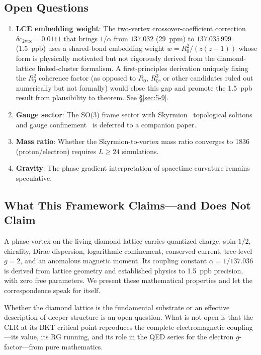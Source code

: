 \documentclass[aps,prd,onecolumn,superscriptaddress,floatfix,12pt]{revtex4-2}
\newcommand{\Rzero}{R_0}
\begin{document}
\subsection{Open Questions}\label{sec:8-2}

\begin{enumerate}
\item \textbf{LCE embedding weight}: The two-vertex crossover-coefficient correction $\delta c_{2\text{vtx}} = 0.0111$ that brings $1/\alpha$ from $137.032$ (29~ppm) to $137.035\,999$ (1.5~ppb) uses a shared-bond embedding weight $w = \Rzero^2/(z(z-1))$ whose form is physically motivated but not rigorously derived from the diamond-lattice linked-cluster formalism. A first-principles derivation uniquely fixing the $\Rzero^2$ coherence factor (as opposed to $\Rzero$, $\Rzero^3$, or other candidates ruled out numerically but not formally) would close this gap and promote the 1.5~ppb result from plausibility to theorem. See \S\ref{sec:5-9}.
\item \textbf{Gauge sector}: The SO(3) frame sector with Skyrmion~\cite{Skyrme1962} topological solitons and gauge confinement~\cite{Polyakov1987} is deferred to a companion paper.
\item \textbf{Mass ratio}: Whether the Skyrmion-to-vortex mass ratio converges to 1836 (proton/electron) requires $L \geq 24$ simulations.
\item \textbf{Gravity}: The phase gradient interpretation of spacetime curvature remains speculative.
\end{enumerate}

\subsection{What This Framework Claims---and Does Not Claim}\label{sec:8-3}

A phase vortex on the living diamond lattice carries quantized charge, spin-$1/2$, chirality, Dirac dispersion, logarithmic confinement, conserved current, tree-level $g = 2$, and an anomalous magnetic moment.  Its coupling constant $\alpha = 1/137.036$ is derived from lattice geometry and established physics to 1.5~ppb precision, with zero free parameters.  We present these mathematical properties and let the correspondence speak for itself.

Whether the diamond lattice is the fundamental substrate or an effective description of deeper structure is an open question.  What is not open is that the CLR at its BKT critical point reproduces the complete electromagnetic coupling---its value, its RG running, and its role in the QED series for the electron $g$-factor---from pure mathematics.
\end{document}
